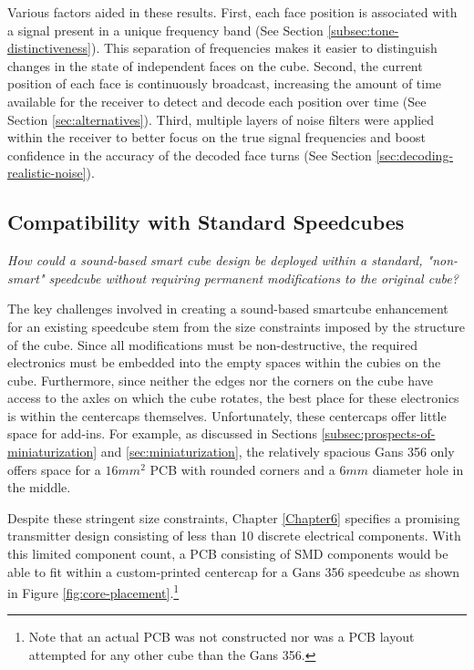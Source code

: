 Various factors aided in these results. First, each face position is
associated with a signal present in a unique frequency band (See
Section \ref{subsec:tone-distinctiveness}). This separation of
frequencies makes it easier to distinguish changes in the state of
independent faces on the cube. Second, the current position of each
face is continuously broadcast, increasing the amount of time available
for the receiver to detect and decode each position over time (See
Section \ref{sec:alternatives}). Third, multiple layers of noise
filters were applied within the receiver to better focus on the true
signal frequencies and boost confidence in the accuracy of the decoded
face turns (See Section \ref{sec:decoding-realistic-noise}).


\subsection{Compatibility with Standard Speedcubes}
\label{subsec:answer-compatibility}

\emph{How could a sound-based smart cube design be deployed within a
standard, "non-smart" speedcube without requiring permanent
modifications to the original cube?}

The key challenges involved in creating a sound-based smartcube
enhancement for an existing speedcube stem from the size constraints
imposed by the structure of the cube. Since all modifications must be
non-destructive, the required electronics must be embedded into the
empty spaces within the cubies on the cube. Furthermore, since neither
the edges nor the corners on the cube have access to the axles on which
the cube rotates, the best place for these electronics is within the
centercaps themselves. Unfortunately, these centercaps offer little
space for add-ins. For example, as discussed in Sections
\ref{subsec:prospects-of-miniaturization} and
\ref{sec:miniaturization}, the relatively spacious Gans 356 only offers
space for a $16mm^2$ PCB with rounded corners and a $6mm$ diameter hole
in the middle.

Despite these stringent size constraints, Chapter \ref{Chapter6}
specifies a promising transmitter design consisting of less than 10
discrete electrical components. With this limited component count, a
PCB consisting of SMD components would be able to fit within a
custom-printed centercap for a Gans 356 speedcube as shown in Figure
\ref{fig:core-placement}.\footnote{Note that an actual PCB was not
constructed nor was a PCB layout attempted for any other cube than the
Gans 356.}

